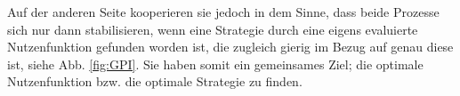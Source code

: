 Auf der anderen Seite kooperieren sie jedoch in dem Sinne, dass beide Prozesse sich nur dann stabilisieren, wenn eine Strategie durch eine eigens evaluierte Nutzenfunktion gefunden worden ist, die zugleich gierig im Bezug auf genau diese ist, siehe Abb. \ref{fig:GPI}. Sie haben somit ein gemeinsames Ziel; die optimale Nutzenfunktion bzw. die optimale Strategie zu finden.